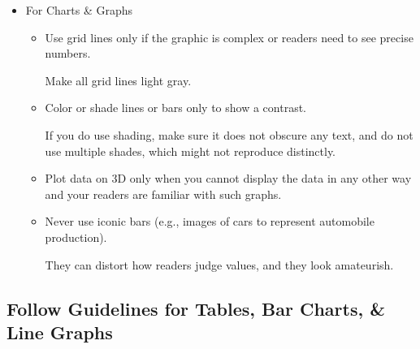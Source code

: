 \documentclass[oneside]{book}
\numberwithin{equation}{section}
\begin{document}
\begin{itemize}
\begin{itemize}
        Use light gray lines if you want to direct your reader's eyes in 1 direction to compare data or if the table is unusually complex.
        \item For tables with many rows, lightly shading every 5th row will improve legibility.
        \item To ensure legibility, do not use a font size smaller than 8 points.
    \end{itemize}
    \item For Charts \& Graphs
    \begin{itemize}
        \item Use grid lines only if the graphic is complex or readers need to see precise numbers.
        
        Make all grid lines light gray.
        \item Color or shade lines or bars only to show a contrast.
        
        If you do use shading, make sure it does not obscure any text, and do not use multiple shades, which might not reproduce distinctly.
        \item Plot data on 3D only when you cannot display the data in any other way and your readers are familiar with such graphs.
        \item Never use iconic bars (e.g., images of cars to represent automobile production).
        
        They can distort how readers judge values, and they look amateurish.
    \end{itemize}
\end{itemize}

\subsection{Follow Guidelines for Tables, Bar Charts, \& Line Graphs}
\end{document}
